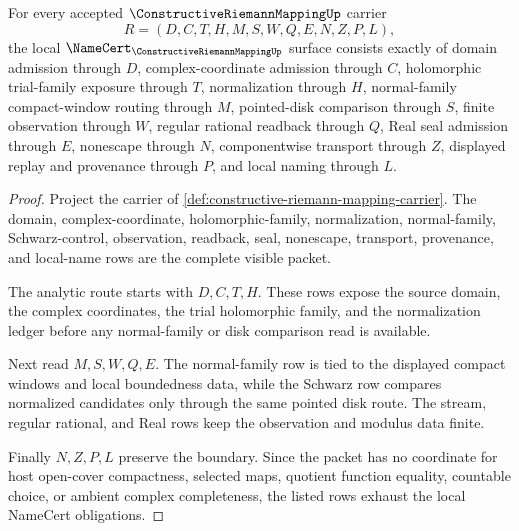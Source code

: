 \begin{theorem}
\label{thm:constructive-riemann-mapping-namecert-obligations}
For every accepted $\ConstructiveRiemannMappingUp$ carrier
$$
R=(D,C,T,H,M,S,W,Q,E,N,Z,P,L),
$$
the local $\NameCert_{\ConstructiveRiemannMappingUp}$ surface consists exactly of domain admission through $D$, complex-coordinate admission through $C$, holomorphic trial-family exposure through $T$, normalization through $H$, normal-family compact-window routing through $M$, pointed-disk comparison through $S$, finite observation through $W$, regular rational readback through $Q$, Real seal admission through $E$, nonescape through $N$, componentwise transport through $Z$, displayed replay and provenance through $P$, and local naming through $L$.
\end{theorem}
\begin{proof}
Project the carrier of \autoref{def:constructive-riemann-mapping-carrier}. The domain, complex-coordinate, holomorphic-family, normalization, normal-family, Schwarz-control, observation, readback, seal, nonescape, transport, provenance, and local-name rows are the complete visible packet.

The analytic route starts with $D,C,T,H$. These rows expose the source domain, the complex coordinates, the trial holomorphic family, and the normalization ledger before any normal-family or disk comparison read is available.

Next read $M,S,W,Q,E$. The normal-family row is tied to the displayed compact windows and local boundedness data, while the Schwarz row compares normalized candidates only through the same pointed disk route. The stream, regular rational, and Real rows keep the observation and modulus data finite.

Finally $N,Z,P,L$ preserve the boundary. Since the packet has no coordinate for host open-cover compactness, selected maps, quotient function equality, countable choice, or ambient complex completeness, the listed rows exhaust the local NameCert obligations.
\end{proof}

